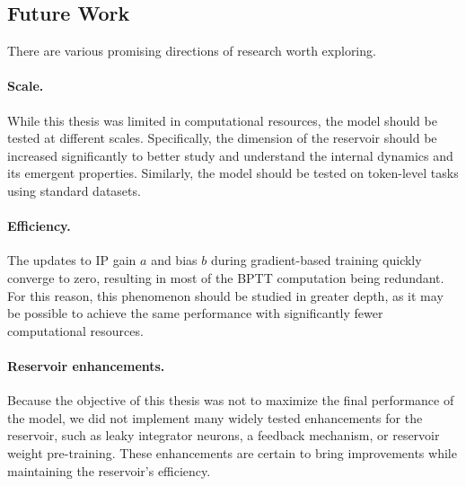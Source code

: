 \documentclass{sapthesis}
\begin{document}
\subsection*{Future Work}
There are various promising directions of research worth exploring.
\paragraph{Scale.} While this thesis was limited in computational resources, the model should be tested at different scales. Specifically, the dimension of the reservoir should be increased significantly to better study and understand the internal dynamics and its emergent properties. Similarly, the model should be tested on token-level tasks using standard datasets.
\paragraph{Efficiency.} The updates to IP gain $a$ and bias $b$ during gradient-based training quickly converge to zero, resulting in most of the BPTT computation being redundant. For this reason, this phenomenon should be studied in greater depth, as it may be possible to achieve the same performance with significantly fewer computational resources.
\paragraph{Reservoir enhancements.} Because the objective of this thesis was not to maximize the final performance of the model, we did not implement many widely tested enhancements for the reservoir, such as leaky integrator neurons, a feedback mechanism, or reservoir weight pre-training. These enhancements are certain to bring improvements while maintaining the reservoir's efficiency.

\backmatter
\cleardoublepage
{}
{}

\end{document}
